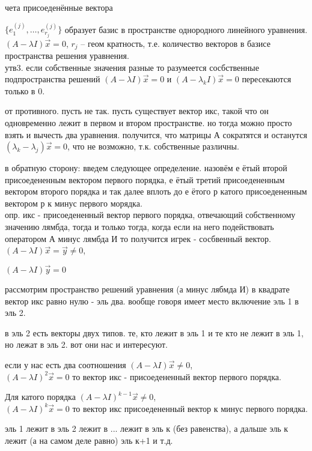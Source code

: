 \documentclass[12pt, a4paper]{article}
\begin{document}
чета присоеденённые вектора

$\{e_1^{(j)}, \dotsc, e_{r_j}^{(j)} \}$ образует базис в пространстве однородного линейного уравнения. $(A-\lambda I)\vec{x} = 0$, $r_j$ -- геом кратность, т.е. количество векторов в базисе пространства решения уравнения.\\

утв3. если собственные значения разные то разумеется сосбственные подпространства решений $(A - \lambda I )\vec{x} = 0$ и $(A - \lambda_k I)\vec{x} = 0$ пересекаются только в 0.

от противного. пусть не так. пусть существует вектор икс, такой что он одновременно лежит в первом и втором пространстве. но тогда можно просто взять и вычесть два уравнения. получится, что матрицы А сократятся и останутся $(\lambda_k - \lambda_j)\vec{x} = 0$, что не возможно, т.к. собственные различны.

в обратную сторону: введем следующее определение. назовём е ётый второй присоедененным вектором первого порядка, е ётый третий присоедененным вектором второго порядка и так далее вплоть до е ётого р катого присоедененным вектором р к минус первого морядка.\\
опр. икс - присоедененный вектор первого порядка, отвечающий собственному значению лямбда, тогда и только тогда, когда если на него подействовать оператором А минус лямбда И то получится игрек - сосбвенный вектор. $(A- \lambda I)\vec{x} = \vec{y} \neq 0$,

$(A - \lambda I) \vec{y} = 0$

рассмотрим пространство решений уравнения (а минус лябмда И) в квадрате вектор икс равно нулю - эль два. вообще говоря имеет место включение эль 1 в эль 2. 

в эль 2 есть векторы двух типов. те, кто лежит в эль 1 и те кто не лежит в  эль 1, но лежат в эль 2. вот они нас и интересуют.

если у нас есть два соотношения $(A - \lambda I)\vec{x} \neq 0$,\\$(A - \lambda I)^2\vec{x} = 0$ то вектор икс - присоедененный вектор первого порядка. 

Для катого порядка $(A- \lambda I)^{k-1}\vec{x} \neq 0$, \\
$(A - \lambda I)^k \vec{x} = 0$ то вектор икс присоедененный вектор к минус первого порядка.

эль 1 лежит в эль 2 лежит в ... лежит в эль к (без равенства), а дальше эль к лежит (а на самом деле равно) эль к+1 и т.д.
\end{document}
